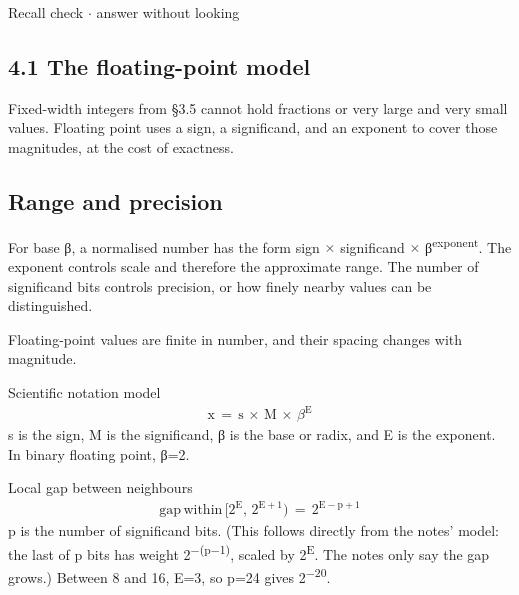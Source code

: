 \documentclass[11pt]{article}
\begin{document}
\begin{keepsection}
\begin{keepsection}
\begin{recallbox}{Recall check \ensuremath{\cdot} answer without looking}
\end{recallbox}
\end{keepsection}
\end{keepsection}

\begin{keepsection}
\section{4.1 The floating-point model}

Fixed-width integers from §3.5 cannot hold fractions or very large and very small values. Floating point uses a sign, a significand, and an exponent to cover those magnitudes, at the cost of exactness.

\begin{keepsection}
\subsection{Range and precision}

For base β, a normalised number has the form sign \ensuremath{\times} significand \ensuremath{\times} β\textsuperscript{exponent}. The exponent controls scale and therefore the approximate range. The number of significand bits controls precision, or how finely nearby values can be distinguished.

Floating-point values are finite in number, and their spacing changes with magnitude.

\begin{equationcard}{Scientific notation model}
\[ \begin{gathered} \mathrm{x}\, =\, \mathrm{s}\, \times \, \mathrm{M}\, \times \, β^{\mathrm{E}} \end{gathered} \]
{\small s is the sign, M is the significand, β is the base or radix, and E is the exponent. In binary floating point, β=2.}
\end{equationcard}

\begin{equationcard}{Local gap between neighbours}
\[ \begin{gathered} \text{gap}\, \text{within}\, [2^{\mathrm{E}},\, 2^{\mathrm{E}+1})\, =\, 2^{\mathrm{E}-\mathrm{p}+1} \end{gathered} \]
{\small p is the number of significand bits. (This follows directly from the notes’ model: the last of p bits has weight 2\textsuperscript{\ensuremath{-}(p\ensuremath{-}1)}, scaled by 2\textsuperscript{E}. The notes only say the gap grows.) Between 8 and 16, E=3, so p=24 gives 2\textsuperscript{\ensuremath{-}20}.}
\end{equationcard}


\end{keepsection}
\end{keepsection}
\end{document}
